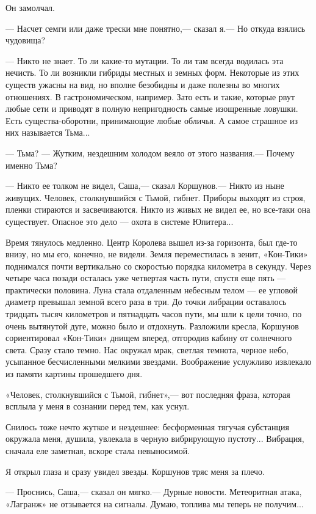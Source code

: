 \documentclass[11pt,a4paper,oneside]{article}
\begin{document}
Он замолчал.

— Насчет семги или даже трески мне понятно,— сказал я.— Но откуда взялись чудовища?

— Никто не знает. То ли какие-то мутации. То ли там всегда водилась эта нечисть. То ли возникли гибриды местных и земных форм. Некоторые из этих существ ужасны на вид, но вполне безобидны и даже полезны во многих отношениях. В гастрономическом, например. Зато есть и такие, которые рвут любые сети и приводят в полную непригодность самые изощренные ловушки. Есть существа-оборотни, принимающие любые обличья. А самое страшное из них называется Тьма...

— Тьма? — Жутким, нездешним холодом веяло от этого названия.— Почему именно Тьма?

— Никто ее толком не видел, Саша,— сказал Коршунов.— Никто из ныне живущих. Человек, столкнувшийся с Тьмой, гибнет. Приборы выходят из строя, пленки стираются и засвечиваются. Никто из живых не видел ее, но все-таки она существует. Опасное это дело — охота в системе Юпитера...

Время тянулось медленно. Центр Королева вышел из-за горизонта, был где-то внизу, но мы его, конечно, не видели. Земля переместилась в зенит, «Кон-Тики» поднимался почти вертикально со скоростью порядка километра в секунду. Через четыре часа позади осталась уже четвертая часть пути, спустя еще пять — практически половина. Луна стала отдаленным небесным телом — ее угловой диаметр превышал земной всего раза в три. До точки либрации оставалось тридцать тысяч километров и пятнадцать часов пути, мы шли к цели точно, по очень вытянутой дуге, можно было и отдохнуть. Разложили кресла, Коршунов сориентировал «Кон-Тики» днищем вперед, отгородив кабину от солнечного света. Сразу стало темно. Нас окружал мрак, светлая темнота, черное небо, усыпанное бесчисленными мелкими звездами. Воображение услужливо извлекало из памяти картины прошедшего дня.

«Человек, столкнувшийся с Тьмой, гибнет»,— вот последняя фраза, которая всплыла у меня в сознании перед тем, как уснул.

Снилось тоже нечто жуткое и нездешнее: бесформенная тягучая субстанция окружала меня, душила, увлекала в черную вибрирующую пустоту... Вибрация, сначала еле заметная, вскоре стала невыносимой.

Я открыл глаза и сразу увидел звезды. Коршунов тряс меня за плечо.

— Проснись, Саша,— сказал он мягко.— Дурные новости. Метеоритная атака, «Лагранж» не отзывается на сигналы. Думаю, топлива мы теперь не получим...
\end{document}
